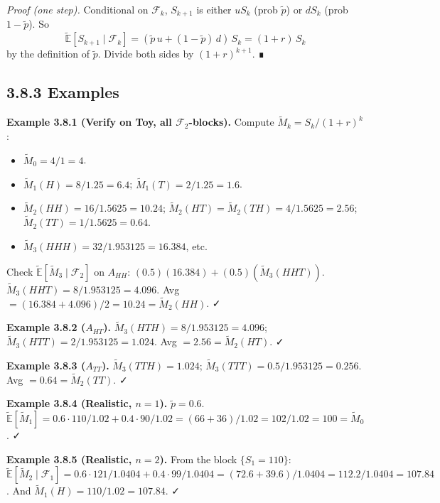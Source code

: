 \documentclass[
  10pt,
  twoside]{book}
\providecommand{\tightlist}{%
  \setlength{\itemsep}{0pt}\setlength{\parskip}{0pt}}
\begin{document}
\emph{Proof (one step).} Conditional on \(\mathcal F_k\), \(S_{k+1}\) is
either \(u S_k\) (prob \(\tilde p\)) or \(d S_k\) (prob \(1-\tilde p\)).
So
\[\tilde{\mathbb E}[S_{k+1} \mid \mathcal F_k] = (\tilde p\,u + (1-\tilde p)\,d)\, S_k = (1+r)\, S_k\]
by the definition of \(\tilde p\). Divide both sides by \((1+r)^{k+1}\).
∎

\subsection{3.8.3 Examples}\label{examples-18}

\textbf{Example 3.8.1 (Verify on Toy, all \(\mathcal F_2\)-blocks).}
Compute \(\widetilde M_k = S_k / (1+r)^k\):

\begin{itemize}
\tightlist
\item
  \(\widetilde M_0 = 4 / 1 = 4\).
\item
  \(\widetilde M_1(H) = 8 / 1.25 = 6.4\);
  \(\widetilde M_1(T) = 2 / 1.25 = 1.6\).
\item
  \(\widetilde M_2(HH) = 16 / 1.5625 = 10.24\);
  \(\widetilde M_2(HT) = \widetilde M_2(TH) = 4 / 1.5625 = 2.56\);
  \(\widetilde M_2(TT) = 1 / 1.5625 = 0.64\).
\item
  \(\widetilde M_3(HHH) = 32 / 1.953125 = 16.384\), etc.
\end{itemize}

Check \(\tilde{\mathbb E}[\widetilde M_3 \mid \mathcal F_2]\) on
\(A_{HH}\): \((0.5)(16.384) + (0.5)(\widetilde M_3(HHT))\).
\(\widetilde M_3(HHT) = 8/1.953125 = 4.096\). Avg
\(= (16.384 + 4.096)/2 = 10.24 = \widetilde M_2(HH)\). ✓

\textbf{Example 3.8.2 (\(A_{HT}\)).}
\(\widetilde M_3(HTH) = 8/1.953125 = 4.096\);
\(\widetilde M_3(HTT) = 2/1.953125 = 1.024\). Avg
\(= 2.56 = \widetilde M_2(HT)\). ✓

\textbf{Example 3.8.3 (\(A_{TT}\)).} \(\widetilde M_3(TTH) = 1.024\);
\(\widetilde M_3(TTT) = 0.5/1.953125 = 0.256\). Avg
\(= 0.64 = \widetilde M_2(TT)\). ✓

\textbf{Example 3.8.4 (Realistic, \(n=1\)).} \(\tilde p = 0.6\).
\(\tilde{\mathbb E}[\widetilde M_1] = 0.6 \cdot 110/1.02 + 0.4 \cdot 90/1.02 = (66 + 36)/1.02 = 102/1.02 = 100 = \widetilde M_0\).
✓

\textbf{Example 3.8.5 (Realistic, \(n=2\)).} From the block
\(\{S_1 = 110\}\):
\(\tilde{\mathbb E}[\widetilde M_2 \mid \mathcal F_1] = 0.6 \cdot 121/1.0404 + 0.4 \cdot 99/1.0404 = (72.6 + 39.6)/1.0404 = 112.2/1.0404 = 107.84\).
And \(\widetilde M_1(H) = 110/1.02 = 107.84\). ✓
\end{document}
